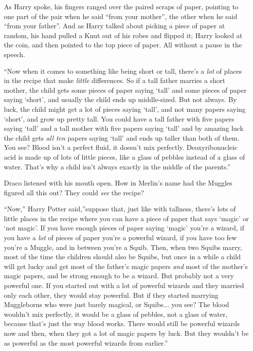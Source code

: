 As Harry spoke, his fingers ranged over the paired scraps of paper,
pointing to one part of the pair when he said ``from your mother'', the
other when he said ``from your father''. And as Harry talked about
picking a piece of paper at random, his hand pulled a Knut out of his
robes and flipped it; Harry looked at the coin, and then pointed to the
top piece of paper. All without a pause in the speech.

``Now when it comes to something like being short or tall, there's a
\emph{lot} of places in the recipe that make \emph{little} differences.
So if a tall father marries a short mother, the child gets some pieces
of paper saying `tall' and some pieces of paper saying `short', and
usually the child ends up middle-sized. But not always. By luck, the
child might get a lot of pieces saying `tall', and not many papers
saying `short', and grow up pretty tall. You could have a tall father
with five papers saying `tall' and a tall mother with five papers saying
`tall' and by amazing luck the child gets \emph{all ten} papers saying
`tall' and ends up taller than both of them. You see? Blood isn't a
perfect fluid, it doesn't mix perfectly. Deoxyribonucleic acid is made
up of lots of little pieces, like a glass of pebbles instead of a glass
of water. That's why a child isn't always exactly in the middle of the
parents.''

Draco listened with his mouth open. How in Merlin's name had the Muggles
figured all this out? They could \emph{see} the recipe?

``Now,'' Harry Potter said,''suppose that, just like with tallness,
there's lots of little places in the recipe where you can have a piece
of paper that says `magic' or `not magic'. If you have enough pieces of
paper saying `magic' you're a wizard, if you have a \emph{lot} of pieces
of paper you're a powerful wizard, if you have too few you're a Muggle,
and in between you're a Squib. Then, when two Squibs marry, most of the
time the children should also be Squibs, but once in a while a child
will get lucky and get most of the father's magic papers \emph{and} most
of the mother's magic papers, and be strong enough to be a wizard. But
probably not a very powerful one. If you started out with a lot of
powerful wizards and they married only each other, they would stay
powerful. But if they started marrying Muggleborns who were just barely
magical, or Squibs... you see? The blood wouldn't mix perfectly, it
would be a glass of pebbles, not a glass of water, because that's just
the way blood works. There would still be powerful wizards now and then,
when they got a lot of magic papers by luck. But they wouldn't be as
powerful as the most powerful wizards from earlier.''

